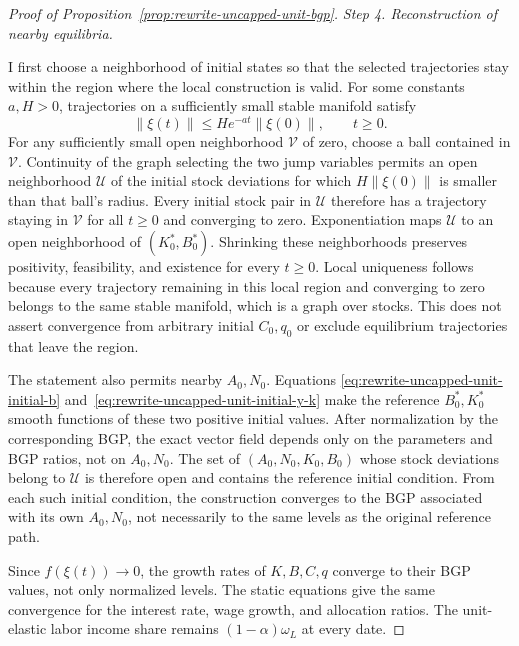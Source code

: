 \begin{proof}[Proof of Proposition~\ref{prop:rewrite-uncapped-unit-bgp}]
\par\medskip\noindent\textit{Step 4. Reconstruction of nearby equilibria.}

I first choose a neighborhood of initial states so that the selected
trajectories stay within the region where the local construction is valid.
For some constants $a,H>0$, trajectories on a sufficiently small stable
manifold satisfy
\[
 \|\xi(t)\|\leq H e^{-at}\|\xi(0)\|,\qquad t\geq0.
\]
For any sufficiently small open neighborhood $\mathcal V$ of zero,
choose a ball contained in $\mathcal V$. Continuity of the graph selecting
the two jump variables permits an open neighborhood $\mathcal U$ of the
initial stock deviations for which $H\|\xi(0)\|$ is smaller than that
ball's radius. Every initial stock pair in $\mathcal U$ therefore has a
trajectory staying in $\mathcal V$ for all $t\geq0$ and converging to zero.
Exponentiation maps $\mathcal U$ to an open neighborhood of
$(K_0^*,B_0^*)$. Shrinking these neighborhoods preserves positivity,
feasibility, and existence for every $t\geq0$. Local uniqueness follows
because every trajectory remaining in this local region and converging
to zero belongs to the same stable manifold, which is a graph over stocks.
This does not assert convergence from arbitrary initial $C_0,q_0$ or
exclude equilibrium trajectories that leave the region.

The statement also permits nearby $A_0,N_0$. Equations
\eqref{eq:rewrite-uncapped-unit-initial-b}
and~\eqref{eq:rewrite-uncapped-unit-initial-y-k} make the reference
$B_0^*,K_0^*$ smooth functions of these two positive initial values.
After normalization by the corresponding BGP, the exact vector field
depends only on the parameters and BGP ratios, not on $A_0,N_0$.
The set of $(A_0,N_0,K_0,B_0)$ whose stock deviations belong to
$\mathcal U$ is therefore open and contains the reference initial condition.
From each such initial condition, the construction converges to the BGP
associated with its own $A_0,N_0$, not necessarily to the same levels as
the original reference path.

Since $f(\xi(t))\to0$, the growth rates of $K,B,C,q$ converge to their
BGP values, not only normalized levels. The static equations give the same convergence for
the interest rate, wage growth, and allocation ratios. The unit-elastic
labor income share remains $(1-\alpha)\omega_L$ at every date.


\end{proof}
